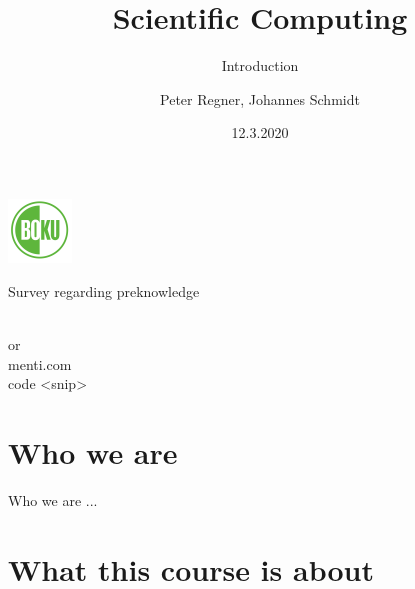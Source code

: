\documentclass[10pt,color=usenames,dvipsnames]{beamer}
\title[Scientific Computing]{Scientific Computing}
\subtitle{Introduction}
\author{Peter Regner, Johannes Schmidt}
\institute{Institute for Sustainable Economic Development, BOKU, Wien}
\date{12.3.2020}
\begin{document}
\begin{frame}[plain]
    \maketitle
    \begin{center}
        \includegraphics[height=1.7cm]{boku-logo.pdf}\\
    \end{center}
\end{frame}

\begin{frame}{Survey regarding preknowledge}
    \begin{center}
        \textcolor{black}{
        }\\
        \vspace{0.5cm}
        \huge{
            or\\
            menti.com\\
            code <snip>
        }
    \end{center}
\end{frame}

\begin{frame}
	
	\tableofcontents
	
\end{frame}

\section{Who we are}

\begin{frame}{Who we are}
...	
\end{frame}

\section{What this course is about}
\end{document}
